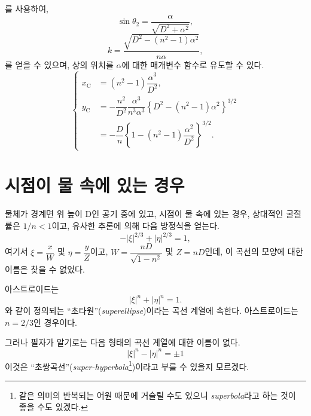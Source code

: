 \documentclass[twocolumn]{article}
\begin{document}
	를 사용하여,
	$$\sin\theta_2 = \dfrac{\alpha}{\sqrt{D^2+\alpha^2}},$$
	$$k = \dfrac{\sqrt{D^2-(n^2-1)\alpha^2}}{n\alpha},$$
	를 얻을 수 있으며, 
	상의 위치를 $\alpha$에 대한 매개변수 함수로 유도할 수 있다.
	$$ \left\{ 
	\begin{aligned}
		x_{\mathrm{C}}^{} &= (n^2-1)\dfrac{\alpha^3}{D^2},\\
		y_{\mathrm{C}}^{} &= -\dfrac{n^2}{D^2}\dfrac{\alpha^3}
		{n^3\alpha^3}\left\{ D^2-(n^2-1)\alpha^2 \right\}^{3/2}\\
		&=-\dfrac{D}{n}\left\{ 1-(n^2-1)\dfrac{\alpha^2}{D^2} \right\}^{3/2}.
	\end{aligned}
	\right.$$
	
\section{시점이 물 속에 있는 경우}

물체가 경계면 위 높이 D인 공기 중에 있고, 
시점이 물 속에 있는 경우, 상대적인 굴절률은 $1/n < 1$이고, 
유사한 추론에 의해 다음 방정식을 얻는다.
$$ - \left| \xi \right|^{2/3} + \left| \eta \right|^{2/3} = 1, $$
여기서 $\xi = \dfrac{x}{W} $ 및 $\eta = \dfrac{y}{Z}$이고, 
$W = \dfrac{nD}{\sqrt{1-n^2}}$ 및 $Z = nD$인데,  
이 곡선의 모양에 대한 이름은 찾을 수 없었다. 

아스트로이드는 
$$ \left| \xi \right|^{n} + \left| \eta \right|^{n} = 1. $$
와 같이 정의되는 ``초타원''(\emph{superellipse})이라는 곡선 계열에 속한다. 
아스트로이드는 $n=2/3$인 경우이다.
 
그러나 필자가 알기로는 다음 형태의 곡선 계열에 대한 이름이 없다.
$$ \left| \xi \right|^{n} - \left| \eta \right|^{n} = \pm 1 $$
이것은 ``초쌍곡선''(\emph{super-hyperbola}\footnote{같은 의미의 반복되는 어원
때문에 거슬릴 수도 있으니 \emph{superbola}라고 하는 것이 
좋을 수도 있겠다.})이라고 부를 수 있을지 모르겠다. 
\end{document}
